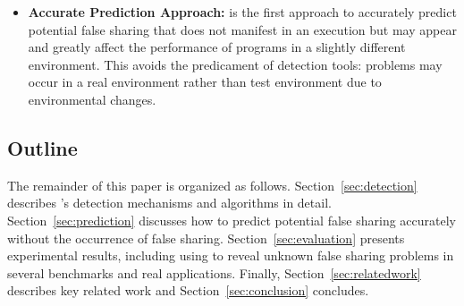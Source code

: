 \begin{itemize}
\item
\textbf{Accurate Prediction Approach:} is the first approach to accurately predict potential false sharing that does
not manifest in an execution but may appear and greatly affect the performance of programs 
in a slightly different environment. 
This avoids the predicament of detection tools: problems may occur in a real
environment rather than test environment due to environmental changes. 


\end{itemize}

\subsection*{Outline}

The remainder of this paper is organized as follows. 
Section~\ref{sec:detection} describes 's detection mechanisms and
algorithms in detail.
Section~\ref{sec:prediction} discusses how to predict potential false sharing accurately 
without the occurrence of false sharing. 
Section~\ref{sec:evaluation} presents experimental results, including using  to 
reveal unknown false sharing problems in several benchmarks and real applications. 
Finally, 
Section~\ref{sec:relatedwork} describes key related work and Section~\ref{sec:conclusion} concludes.


